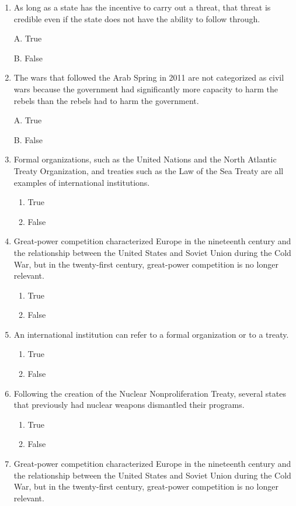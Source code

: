 \documentclass[
]{book}
\begin{document}
\begin{enumerate}
\def\labelenumi{\arabic{enumi}.}
\item
  As long as a state has the incentive to carry out a threat, that threat is credible even if the state does not have the ability to follow through.

  A. True

  B. False
\item
  The wars that followed the Arab Spring in 2011 are not categorized as civil wars because the government had significantly more capacity to harm the rebels than the rebels had to harm the government.

  A. True

  B. False
\item
  Formal organizations, such as the United Nations and the North Atlantic Treaty Organization, and treaties such as the Law of the Sea Treaty are all examples of international institutions.

  \begin{enumerate}
  \def\labelenumii{\Alph{enumii}.}
  \item
    True
  \item
    False
  \end{enumerate}
\item
  Great-power competition characterized Europe in the nineteenth century and the relationship between the United States and Soviet Union during the Cold War, but in the twenty-first century, great-power competition is no longer relevant.

  \begin{enumerate}
  \def\labelenumii{\Alph{enumii}.}
  \item
    True
  \item
    False
  \end{enumerate}
\item
  An international institution can refer to a formal organization or to a treaty.

  \begin{enumerate}
  \def\labelenumii{\Alph{enumii}.}
  \item
    True
  \item
    False
  \end{enumerate}
\item
  Following the creation of the Nuclear Nonproliferation Treaty, several states that previously had nuclear weapons dismantled their programs.

  \begin{enumerate}
  \def\labelenumii{\Alph{enumii}.}
  \item
    True
  \item
    False
  \end{enumerate}
\item
  Great-power competition characterized Europe in the nineteenth century and the relationship between the United States and Soviet Union during the Cold War, but in the twenty-first century, great-power competition is no longer relevant.


\end{enumerate}
\end{document}
